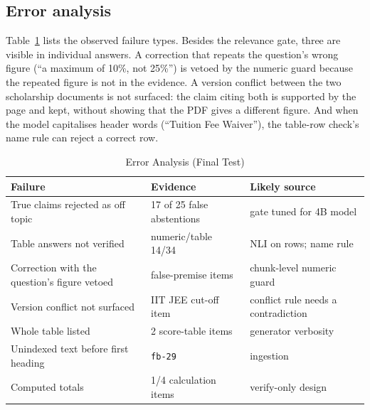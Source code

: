 \documentclass[conference]{IEEEtran}
\newcommand{\code}[1]{\texttt{#1}}
\begin{document}
\subsection{Error analysis}
Table~\ref{tab:errors} lists the observed failure types. Besides the relevance gate, three are visible in
individual answers. A correction that repeats the question's wrong figure (``a maximum of 10\%, not 25\%'')
is vetoed by the numeric guard because the repeated figure is not in the evidence. A version conflict between
the two scholarship documents is not surfaced: the claim citing both is supported by the page and kept,
without showing that the PDF gives a different figure. And when the model capitalises header words
(``Tuition Fee Waiver''), the table-row check's name rule can reject a correct row.

\begin{table}[t]
\caption{Error Analysis (Final Test)}
\label{tab:errors}
\centering\scriptsize
\begin{tabular}{@{}p{30mm}p{20mm}p{25mm}@{}}
\toprule
Failure & Evidence & Likely source\\
\midrule
True claims rejected as off topic & 17 of 25 false abstentions & gate tuned for 4B model\\
Table answers not verified & numeric/table 14/34 & NLI on rows; name rule\\
Correction with the question's figure vetoed & false-premise items & chunk-level numeric guard\\
Version conflict not surfaced & IIT JEE cut-off item & conflict rule needs a contradiction\\
Whole table listed & 2 score-table items & generator verbosity\\
Unindexed text before first heading & \code{fb-29} & ingestion\\
Computed totals & 1/4 calculation items & verify-only design\\
\bottomrule
\end{tabular}
\end{table}
\end{document}
